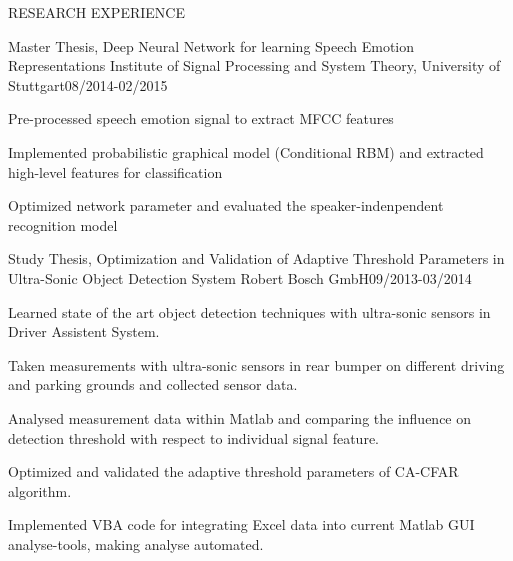 \documentclass{resume} %
\begin{document}
\begin{rSection}{RESEARCH  EXPERIENCE}

\begin{rSubsection}{Master Thesis,  Deep Neural Network for learning Speech Emotion Representations
}{}{Institute of Signal Processing and System Theory, University of Stuttgart}{08/2014-02/2015}

\item Pre-processed speech emotion signal to extract MFCC features
\item Implemented probabilistic graphical model (Conditional RBM) and extracted high-level features for classification
\item Optimized network parameter and evaluated the speaker-indenpendent recognition model

\end{rSubsection}


\begin{rSubsection}{Study Thesis, Optimization and Validation of Adaptive Threshold Parameters in Ultra-Sonic Object Detection System 
}{}{Robert Bosch GmbH}{09/2013-03/2014}

\item Learned state of the art object detection techniques with ultra-sonic sensors in Driver Assistent System.
\item Taken measurements with ultra-sonic sensors in rear bumper on different driving and parking grounds and collected sensor data.
\item Analysed measurement data within Matlab and comparing the influence on detection threshold with respect to individual signal feature.
\item Optimized and validated the adaptive threshold parameters of CA-CFAR algorithm.
\item Implemented VBA code for integrating Excel data into current Matlab GUI analyse-tools, making analyse automated. 


\end{rSubsection}
\end{rSection}
\end{document}
